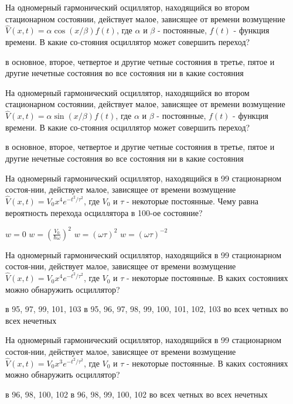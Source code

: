 \documentclass[11pt,a4paper]{exam}
\begin{document}
\begin{questions}
\question На одномерный гармонический осциллятор, находящийся во втором стационарном состоянии, действует малое, зависящее от времени возмущение $\hat V(x,t) = \alpha \cos (x/\beta )f(t)$, где $\alpha $ и $\beta $ - постоянные, $f(t)$ - функция времени. В какие со-стояния осциллятор может совершить переход? 
\begin{choices}
\choice в основное, второе, четвертое и другие четные состояния
\choice в третье, пятое и другие нечетные состояния
\choice во все состояния
\choice ни в какие состояния
\end{choices}

\question На одномерный гармонический осциллятор, находящийся во втором стационарном состоянии, действует малое, зависящее от времени возмущение $\hat V(x,t) = \alpha \sin (x/\beta )f(t)$, где $\alpha $ и $\beta $ - постоянные, $f(t)$ - функция времени. В какие со-стояния осциллятор может совершить переход? 
\begin{choices}
\choice в основное, второе, четвертое и другие четные состояния
\choice в третье, пятое и другие нечетные состояния
\choice во все состояния
\choice ни в какие состояния
\end{choices}

\question На одномерный гармонический осциллятор, находящийся в 99 стационарном состоя-нии, действует малое, зависящее от времени возмущение $\hat V(x,t) = {V_0}{x^4}{e^{ - {t^2}/{\tau ^2}}}$, где ${V_0}$ и $\tau $ - некоторые постоянные. Чему равна вероятность перехода осциллятора в 100-ое состояние? 
\begin{choices}
\choice $w = 0$  
\choice $w = {\left( {\frac{{{V_0}}}{{\hbar \omega }}} \right)^2}$     
\choice $w = {(\omega \tau )^2}$      
\choice $w = {(\omega \tau )^{ - 2}}$
\end{choices}

\question На одномерный гармонический осциллятор, находящийся в 99 стационарном состоя-нии, действует малое, зависящее от времени возмущение $\hat V(x,t) = {V_0}{x^4}{e^{ - {t^2}/{\tau ^2}}}$, где ${V_0}$ и $\tau $ - некоторые постоянные. В каких состояниях можно обнаружить осциллятор? 
\begin{choices}
\choice в 95, 97, 99, 101, 103     
\choice в 95, 96, 97, 98, 99, 100, 101, 102, 103
\choice во всех четных       
\choice во всех нечетных
\end{choices}

\question На одномерный гармонический осциллятор, находящийся в 99 стационарном состоя-нии, действует малое, зависящее от времени возмущение $\hat V(x,t) = {V_0}{x^3}{e^{ - {t^2}/{\tau ^2}}}$, где ${V_0}$ и $\tau $ - некоторые постоянные. В каких состояниях можно обнаружить осциллятор? 
\begin{choices}
\choice в 96, 98, 100, 102         
\choice в 96, 98, 99, 100, 102
\choice во всех четных       
\choice во всех нечетных
\end{choices}


\end{questions}
\end{document}
